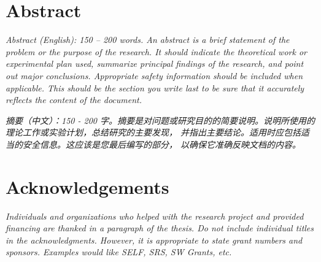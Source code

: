 \documentclass[11pt,a4paper,oneside]{report}
\newcommand{\instructions}[1]{{\color{orange}\itshape #1}}
\begin{document}

\clearpage
{}


\setcounter{tocdepth}{0} %
\tableofcontents


\chapter*{Abstract}


\instructions{Abstract (English): 150 -- 200 words. An abstract is a brief
    statement of the problem or the purpose of the research. It should indicate
    the theoretical work or experimental plan used, summarize principal findings
    of the research, and point out major conclusions. Appropriate safety
    information should be included when applicable. This should be the section
    you write last to be sure that it accurately reflects the content of the
    document.}

\vspace{4\bigskipamount}


\instructions{摘要（中文）：150 - 200
    字。摘要是对问题或研究目的的简要说明。说明所使用的理论工作或实验计划，总结研究的主要发现，
    并指出主要结论。适用时应包括适当的安全信息。这应该是您最后编写的部分，
    以确保它准确反映文档的内容。}



\chapter*{Acknowledgements}
\label{acknowledgements}

\instructions{Individuals and organizations who helped with the research project
    and provided financing are thanked in a paragraph of the thesis. Do not
    include individual titles in the acknowledgments. However, it is
    appropriate to state grant numbers and sponsors. Examples would like
    SELF, SRS, SW Grants, etc.}
\end{document}

